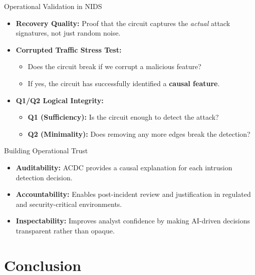 \documentclass{beamer}
\begin{document}
	\begin{frame}{Operational Validation in NIDS}
		\begin{itemize}
			\item \textbf{Recovery Quality:} Proof that the circuit captures the \textit{actual} attack signatures, not just random noise.
			
			\vspace{0.5em}
			
			\item \textbf{Corrupted Traffic Stress Test:} 
			\begin{itemize}
				\item Does the circuit break if we corrupt a malicious feature?
				\item If yes, the circuit has successfully identified a \textbf{causal feature}.
			\end{itemize}
			
			\vspace{0.5em}
			
			\item \textbf{Q1/Q2 Logical Integrity:}
			\begin{itemize}
				\item \textbf{Q1 (Sufficiency):} Is the circuit enough to detect the attack?
				\item \textbf{Q2 (Minimality):} Does removing any more edges break the detection?
			\end{itemize}
		\end{itemize}
	\end{frame}
	
	\begin{frame}{Building Operational Trust}
		\begin{itemize}
			\item \textbf{Auditability:}
			ACDC provides a causal explanation for each intrusion detection decision.
			
			\item \textbf{Accountability:}
			Enables post-incident review and justification in regulated and security-critical environments.
			
			\item \textbf{Inspectability:}
			Improves analyst confidence by making AI-driven decisions transparent rather than opaque.
		\end{itemize}
	\end{frame}	
	
	\section{Conclusion}
	
\end{document}
